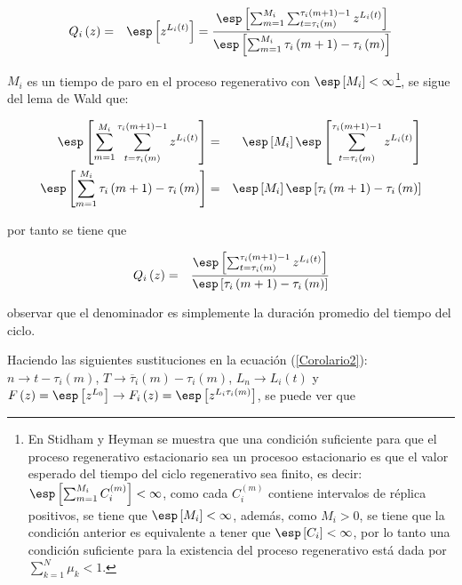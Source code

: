 \begin{eqnarray*}
Q_{i}\left(z\right)&=&\esp\left[z^{L_{i}\left(t\right)}\right]=\frac{\esp\left[\sum_{m=1}^{M_{i}}\sum_{t=\tau_{i}\left(m\right)}^{\tau_{i}\left(m+1\right)-1}z^{L_{i}\left(t\right)}\right]}{\esp\left[\sum_{m=1}^{M_{i}}\tau_{i}\left(m+1\right)-\tau_{i}\left(m\right)\right]}
\end{eqnarray*}

$M_{i}$ es un tiempo de paro en el proceso regenerativo con $\esp\left[M_{i}\right]<\infty$\footnote{En Stidham\cite{Stidham} y Heyman  se muestra que una condici\'on suficiente para que el proceso regenerativo 
estacionario sea un procesoo estacionario es que el valor esperado del tiempo del ciclo regenerativo sea finito, es decir: $\esp\left[\sum_{m=1}^{M_{i}}C_{i}^{(m)}\right]<\infty$, como cada $C_{i}^{(m)}$ contiene intervalos de r\'eplica positivos, se tiene que $\esp\left[M_{i}\right]<\infty$, adem\'as, como $M_{i}>0$, se tiene que la condici\'on anterior es equivalente a tener que $\esp\left[C_{i}\right]<\infty$,
por lo tanto una condici\'on suficiente para la existencia del proceso regenerativo est\'a dada por $\sum_{k=1}^{N}\mu_{k}<1.$}, se sigue del lema de Wald que:


\begin{eqnarray*}
\esp\left[\sum_{m=1}^{M_{i}}\sum_{t=\tau_{i}\left(m\right)}^{\tau_{i}\left(m+1\right)-1}z^{L_{i}\left(t\right)}\right]&=&\esp\left[M_{i}\right]\esp\left[\sum_{t=\tau_{i}\left(m\right)}^{\tau_{i}\left(m+1\right)-1}z^{L_{i}\left(t\right)}\right]\\
\esp\left[\sum_{m=1}^{M_{i}}\tau_{i}\left(m+1\right)-\tau_{i}\left(m\right)\right]&=&\esp\left[M_{i}\right]\esp\left[\tau_{i}\left(m+1\right)-\tau_{i}\left(m\right)\right]
\end{eqnarray*}

por tanto se tiene que


\begin{eqnarray*}
Q_{i}\left(z\right)&=&\frac{\esp\left[\sum_{t=\tau_{i}\left(m\right)}^{\tau_{i}\left(m+1\right)-1}z^{L_{i}\left(t\right)}\right]}{\esp\left[\tau_{i}\left(m+1\right)-\tau_{i}\left(m\right)\right]}
\end{eqnarray*}

observar que el denominador es simplemente la duraci\'on promedio del tiempo del ciclo.


Haciendo las siguientes sustituciones en la ecuaci\'on (\ref{Corolario2}): $n\rightarrow t-\tau_{i}\left(m\right)$, $T \rightarrow \overline{\tau}_{i}\left(m\right)-\tau_{i}\left(m\right)$, $L_{n}\rightarrow L_{i}\left(t\right)$ y $F\left(z\right)=\esp\left[z^{L_{0}}\right]\rightarrow F_{i}\left(z\right)=\esp\left[z^{L_{i}\tau_{i}\left(m\right)}\right]$, se puede ver que

